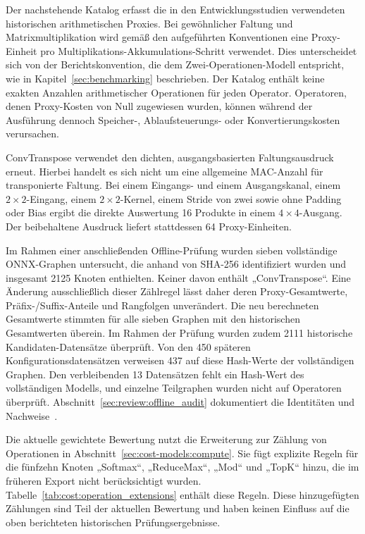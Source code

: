 Der nachstehende Katalog erfasst die in den Entwicklungsstudien verwendeten historischen arithmetischen Proxies. Bei gewöhnlicher Faltung und Matrixmultiplikation wird gemäß den aufgeführten Konventionen eine Proxy-Einheit pro Multiplikations-Akkumulations-Schritt verwendet. Dies unterscheidet sich von der Berichtskonvention, die dem Zwei-Operationen-Modell entspricht, wie in Kapitel~\ref{sec:benchmarking} beschrieben. Der Katalog enthält keine exakten Anzahlen arithmetischer Operationen für jeden Operator. Operatoren, denen Proxy-Kosten von Null zugewiesen wurden, können während der Ausführung dennoch Speicher-, Ablaufsteuerungs- oder Konvertierungskosten verursachen.

ConvTranspose verwendet den dichten, ausgangsbasierten Faltungsausdruck erneut. Hierbei handelt es sich nicht um eine allgemeine MAC-Anzahl für transponierte Faltung. Bei einem Eingangs- und einem Ausgangskanal, einem $2\times2$-Eingang, einem $2\times2$-Kernel, einem Stride von zwei sowie ohne Padding oder Bias ergibt die direkte Auswertung 16 Produkte in einem $4\times4$-Ausgang. Der beibehaltene Ausdruck liefert stattdessen 64 Proxy-Einheiten.

Im Rahmen einer anschließenden Offline-Prüfung wurden sieben vollständige ONNX-Graphen untersucht, die anhand von SHA-256 identifiziert wurden und insgesamt \num{2125} Knoten enthielten. Keiner davon enthält „ConvTranspose“. Eine Änderung ausschließlich dieser Zählregel lässt daher deren Proxy-Gesamtwerte, Präfix-/Suffix-Anteile und Rangfolgen unverändert. Die neu berechneten Gesamtwerte stimmten für alle sieben Graphen mit den historischen Gesamtwerten überein. Im Rahmen der Prüfung wurden zudem \num{2111} historische Kandidaten-Datensätze überprüft. Von den 450 späteren Konfigurationsdatensätzen verweisen 437 auf diese Hash-Werte der vollständigen Graphen. Den verbleibenden 13 Datensätzen fehlt ein Hash-Wert des vollständigen Modells, und einzelne Teilgraphen wurden nicht auf Operatoren überprüft. Abschnitt~\ref{sec:review:offline_audit} dokumentiert die Identitäten und Nachweise~\cite{v53OfflineAudit2026}.

Die aktuelle gewichtete Bewertung nutzt die Erweiterung zur Zählung von Operationen in Abschnitt~\ref{sec:cost-models:compute}. Sie fügt explizite Regeln für die fünfzehn Knoten „Softmax“, „ReduceMax“, „Mod“ und „TopK“ hinzu, die im früheren Export nicht berücksichtigt wurden. Tabelle~\ref{tab:cost:operation_extensions} enthält diese Regeln. Diese hinzugefügten Zählungen sind Teil der aktuellen Bewertung und haben keinen Einfluss auf die oben berichteten historischen Prüfungsergebnisse.

